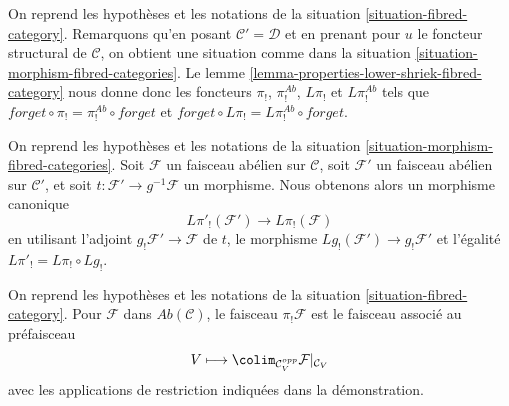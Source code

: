 \begin{remark}
\label{remark-fibred-category}
On reprend les hypothèses et les notations de la
situation \ref{situation-fibred-category}. Remarquons qu'en posant
$\mathcal{C}' = \mathcal{D}$ et en prenant pour $u$ le foncteur structural
de $\mathcal{C}$, on obtient une situation comme dans la
situation \ref{situation-morphism-fibred-categories}. Le
lemme \ref{lemma-properties-lower-shriek-fibred-category} nous donne donc les
foncteurs $\pi_!$, $\pi_!^{\textit{Ab}}$, $L\pi_!$ et
$L\pi_!^{\textit{Ab}}$ tels que
$forget \circ \pi_! = \pi_!^{\textit{Ab}} \circ forget$ et
$forget \circ L\pi_! = L\pi_!^{\textit{Ab}} \circ forget$.
\end{remark}

\begin{remark}
\label{remark-morphism-fibred-categories}
On reprend les hypothèses et les notations de la
situation \ref{situation-morphism-fibred-categories}.
Soit $\mathcal{F}$ un faisceau abélien sur $\mathcal{C}$, soit
$\mathcal{F}'$ un faisceau abélien sur $\mathcal{C}'$, et soit
$t : \mathcal{F}' \to g^{-1}\mathcal{F}$ un morphisme.
Nous obtenons alors un morphisme canonique
$$
L\pi'_!(\mathcal{F}') \longrightarrow L\pi_!(\mathcal{F})
$$
en utilisant l'adjoint $g_!\mathcal{F}' \to \mathcal{F}$ de $t$, le
morphisme $Lg_!(\mathcal{F}') \to g_!\mathcal{F}'$ et l'égalité
$L\pi'_! = L\pi_! \circ Lg_!$.
\end{remark}

\begin{lemma}
\label{lemma-compute-pi-shriek}
On reprend les hypothèses et les notations de la
situation \ref{situation-fibred-category}.
Pour $\mathcal{F}$ dans $\textit{Ab}(\mathcal{C})$, le faisceau
$\pi_!\mathcal{F}$ est le faisceau associé au préfaisceau
$$
V \longmapsto \colim_{\mathcal{C}_V^{opp}} \mathcal{F}|_{\mathcal{C}_V}
$$
avec les applications de restriction indiquées dans la démonstration.
\end{lemma}

